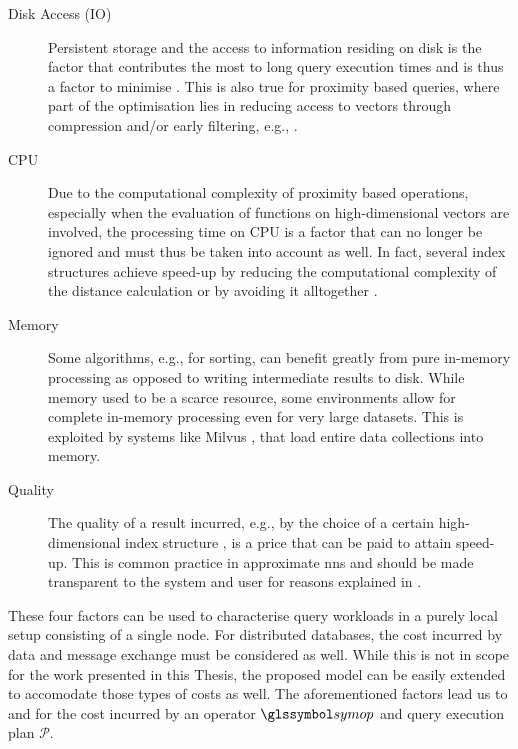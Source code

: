 \begin{description}
    \item[Disk Access (IO)] Persistent storage and the access to information residing on disk is the factor that contributes the most to long query execution times and is thus a factor to minimise \cite{Selinger:1979Access}. This is also true for proximity based queries, where part of the optimisation lies in reducing access to vectors through compression and/or early filtering, e.g., \cite{Weber:1998Va, Chierichetti:2007Finding}.
    \item[CPU] Due to the computational complexity of proximity based operations, especially when the evaluation of functions on high-dimensional vectors are involved, the processing time on CPU is a factor that can no longer be ignored and must thus be taken into account as well. In fact, several index structures achieve speed-up by reducing the computational complexity of the distance calculation \cite{Jegou:2010Product} or by avoiding it alltogether \cite{Weber:1998Va}.
    \item[Memory] Some algorithms, e.g., for sorting, can benefit greatly from pure in-memory processing as opposed to writing intermediate results to disk. While memory used to be a scarce resource, some environments allow for complete in-memory processing even for very large datasets. This is exploited by systems like Milvus \cite{Wang:2021Milvus}, that load entire data collections into memory.
    \item[Quality] The quality of a result incurred, e.g., by the choice of a certain high-dimensional index structure \cite{Indyk1998:Approximate,Jegou:2010Product}, is a price that can be paid to attain speed-up. This is common practice in approximate \acrshort{nns} and should be made transparent to the system and user for reasons explained in .
\end{description}

These four factors can be used to characterise query workloads in a purely local setup consisting of a single node. For distributed databases, the cost incurred by data and message exchange must be considered as well. While this is not in scope for the work presented in this Thesis, the proposed model can be easily extended to accomodate those types of costs as well. The aforementioned factors lead us to  and  for the cost incurred by an operator $\symop$ and query execution plan $\mathcal{P}$.

